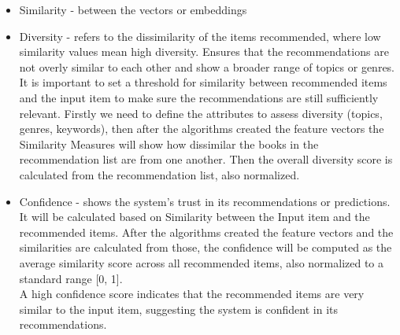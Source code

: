 \documentclass[\myFontSize,a4paper,oneside,english,hidelinks]{article}
\begin{document}
\begin{itemize}

\item Similarity - between the vectors or embeddings



\item Diversity - refers to the dissimilarity of the items recommended, where low similarity values mean high diversity. Ensures that the recommendations are not overly similar to each other and show a broader range of topics or genres. It is important to set a threshold for similarity between recommended items and the input item to make sure the recommendations are still sufficiently relevant. Firstly we need to define the attributes to assess diversity (topics, genres, keywords), then after the algorithms created the feature vectors the Similarity Measures will show how dissimilar the books in the recommendation list are from one another. Then the overall diversity score is calculated from the recommendation list, also normalized.

\item Confidence - shows the system's trust in its recommendations or predictions. It will be calculated based on Similarity between the Input item and the recommended items. After the algorithms created the feature vectors and the similarities are calculated from those, the confidence will be computed as the average similarity score across all recommended items, also normalized to a standard range [0, 1].\\
A high confidence score indicates that the recommended items are very similar to the input item, suggesting the system is confident in its recommendations.


\end{itemize}
\end{document}
